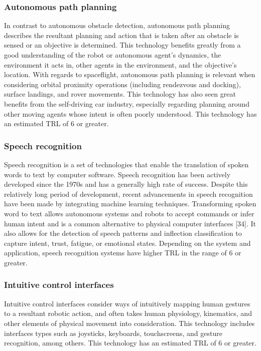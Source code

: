 \subsubsection{Autonomous path planning}
In contrast to autonomous obstacle detection, autonomous path planning describes the resultant planning and action that is taken after an obstacle is sensed or an objective is determined. This technology benefits greatly from a good understanding of the robot or autonomous agent's dynamics, the environment it acts in, other agents in the environment, and the objective's location. With regards to spaceflight, autonomous path planning is relevant when considering orbital proximity operations (including rendezvous and docking), surface landings, and rover movements. This technology has also seen great benefits from the self-driving car industry, especially regarding planning around other moving agents whose intent is often poorly understood. This technology has an estimated TRL of 6 or greater.

\subsubsection{Speech recognition}
Speech recognition is a set of technologies that enable the translation of spoken words to text by computer software. Speech recognition has been actively developed since the 1970s and has a generally high rate of success. Despite this relatively long period of development, recent advancements in speech recognition have been made by integrating machine learning techniques. Transforming spoken word to text allows autonomous systems and robots to accept commands or infer human intent and is a common alternative to physical computer interfaces [34]. It also allows for the detection of speech patterns and inflection classification to capture intent, trust, fatigue, or emotional states. Depending on the system and application, speech recognition systems have higher TRL in the range of 6 or greater.

\subsubsection{Intuitive control interfaces}
Intuitive control interfaces consider ways of intuitively mapping human gestures to a resultant robotic action, and often takes human physiology, kinematics, and other elements of physical movement into consideration. This technology includes interfaces types such as joysticks, keyboards, touchscreens, and gesture recognition, among others. This technology has an estimated TRL of 6 or greater.

